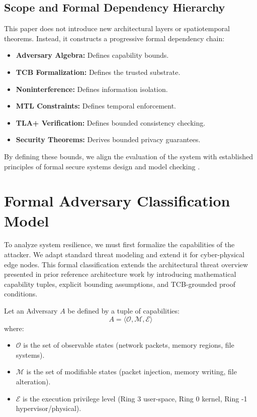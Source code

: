 \documentclass[conference]{IEEEtran}
\begin{document}
\subsection{Scope and Formal Dependency Hierarchy}
This paper does not introduce new architectural layers or spatiotemporal theorems. Instead, it constructs a progressive formal dependency chain:
\begin{itemize}
    \item \textbf{Adversary Algebra:} Defines capability bounds.
    \item \textbf{TCB Formalization:} Defines the trusted substrate.
    \item \textbf{Noninterference:} Defines information isolation.
    \item \textbf{MTL Constraints:} Defines temporal enforcement.
    \item \textbf{TLA+ Verification:} Defines bounded consistency checking.
    \item \textbf{Security Theorems:} Derives bounded privacy guarantees.
\end{itemize}

By defining these bounds, we align the evaluation of the system with established principles of formal secure systems design and model checking \cite{b10}.

\section{Formal Adversary Classification Model}
To analyze system resilience, we must first formalize the capabilities of the attacker. We adapt standard threat modeling \cite{b2} and extend it for cyber-physical edge nodes. This formal classification extends the architectural threat overview presented in prior reference architecture work \cite{b6} by introducing mathematical capability tuples, explicit bounding assumptions, and TCB-grounded proof conditions.

Let an Adversary $A$ be defined by a tuple of capabilities:
\begin{equation}
A = \langle \mathcal{O}, \mathcal{M}, \mathcal{E} \rangle
\end{equation}
where:
\begin{itemize}
    \item $\mathcal{O}$ is the set of observable states (network packets, memory regions, file systems).
    \item $\mathcal{M}$ is the set of modifiable states (packet injection, memory writing, file alteration).
    \item $\mathcal{E}$ is the execution privilege level (Ring 3 user-space, Ring 0 kernel, Ring -1 hypervisor/physical).
\end{itemize}
\end{document}

